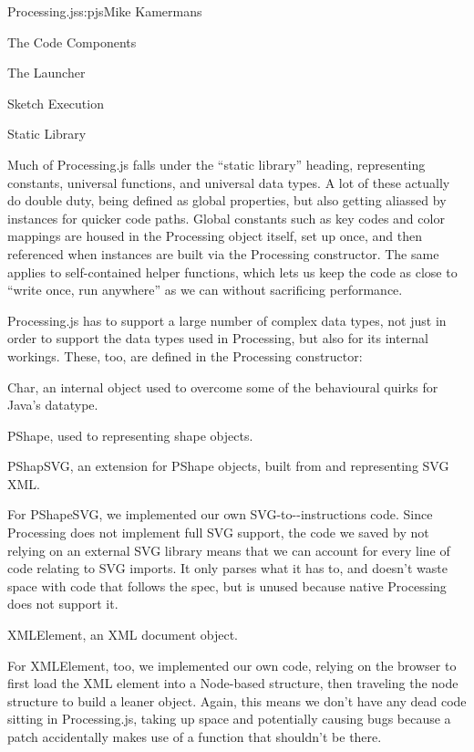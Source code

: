 \begin{aosachapter}{Processing.js}{s:pjs}{Mike Kamermans}
\begin{aosasect1}{The Code Components}
\begin{aosasect2}{The Launcher}
\begin{aosasect3}{Sketch Execution}
\end{aosasect3}

\end{aosasect2}

\begin{aosasect2}{Static Library}

Much of Processing.js falls under the ``static library'' heading,
representing constants, universal functions, and universal data
types. A lot of these actually do double duty, being defined as global
properties, but also getting aliassed by instances for quicker code
paths. Global constants such as key codes and color mappings are
housed in the Processing object itself, set up once, and then
referenced when instances are built via the Processing
constructor. The same applies to self-contained helper functions,
which lets us keep the code as close to ``write once, run anywhere'' as
we can without sacrificing performance.

Processing.js has to support a large number of complex data types, not
just in order to support the data types used in Processing, but also
for its internal workings. These, too, are defined in the Processing
constructor:

\begin{aosaitemize}

\item Char, an internal object used to overcome some of the
  behavioural quirks for Java's  datatype.

\item PShape, used to representing shape objects.

\item PShapSVG, an extension for PShape objects, built from and
  representing SVG XML.

For PShapeSVG, we implemented our own
SVG-to--instructions code. Since
Processing does not implement full SVG support, the code we saved by
not relying on an external SVG library means that we can account for
every line of code relating to SVG imports. It only parses what it has
to, and doesn't waste space with code that follows the spec, but is
unused because native Processing does not support it.

\item XMLElement, an XML document object.

For XMLElement, too, we implemented our own code, relying on the
browser to first load the XML element into a Node-based structure,
then traveling the node structure to build a leaner object. Again,
this means we don't have any dead code sitting in Processing.js,
taking up space and potentially causing bugs because a patch
accidentally makes use of a function that shouldn't be there.


\end{aosaitemize}
\end{aosasect2}
\end{aosasect1}
\end{aosachapter}
